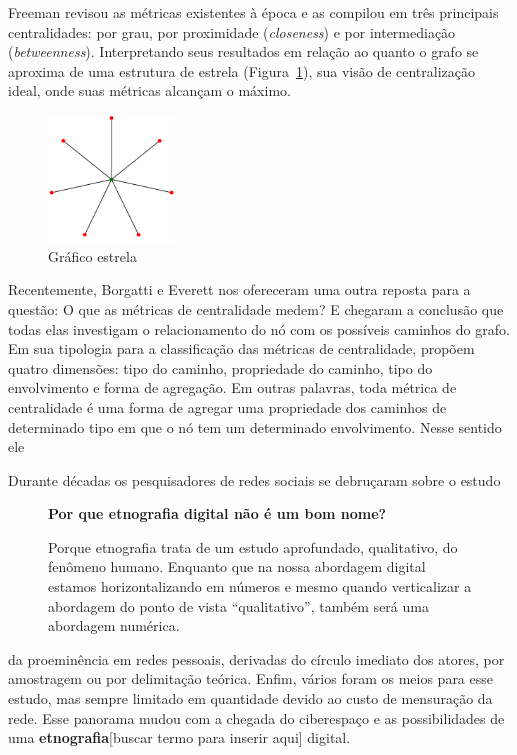 \documentclass{article}
\begin{document}
Freeman revisou as métricas existentes à época \cite{Freeman1979} e as compilou
em três principais centralidades: por grau, por proximidade (\textit{closeness})
e por intermediação (\textit{betweenness}). Interpretando seus resultados em
relação ao quanto o grafo se aproxima de uma estrutura de estrela
(Figura~\ref{fig:star}), sua visão de centralização ideal, onde suas métricas
alcançam o máximo.

\begin{figure}[h!]
  \caption{Gráfico estrela}
  \label{fig:star}
  \centering
    \includegraphics[width=0.3\textwidth]{imgs/star.png}
\end{figure}

Recentemente, Borgatti e Everett \cite{Borgatti2006} nos ofereceram uma
outra reposta para a questão: O que as métricas de centralidade medem? E
chegaram a conclusão que todas elas investigam o relacionamento do nó com os
possíveis caminhos do grafo. Em sua tipologia para a classificação das
métricas de centralidade, propõem quatro dimensões: tipo do caminho,
propriedade do caminho, tipo do envolvimento e forma de agregação. Em outras
palavras, toda métrica de centralidade é uma forma de agregar uma propriedade
dos caminhos de determinado tipo em que o nó tem um determinado envolvimento.
Nesse sentido ele 

Durante décadas os pesquisadores de redes sociais se debruçaram sobre o estudo
\begin{figure}
\begin{boxedminipage}{2in}
\textbf{\large{Por que etnografia digital não é um bom nome?}}
\normalsize{}

Porque etnografia trata de um estudo aprofundado, qualitativo, do fenômeno
humano. Enquanto que na nossa abordagem digital estamos horizontalizando em
números e mesmo quando verticalizar a abordagem do ponto de vista
``qualitativo'', também será uma abordagem numérica.
\end{boxedminipage}
\end{figure} da proeminência em redes pessoais, derivadas do círculo
imediato dos atores, por amostragem ou por delimitação teórica. Enfim, vários foram os meios para esse
estudo, mas sempre limitado em quantidade devido ao custo de mensuração da rede.
Esse panorama mudou com a chegada do ciberespaço e as possibilidades de uma
\textbf{etnografia}[buscar termo para inserir aqui] digital. 
\end{document}
